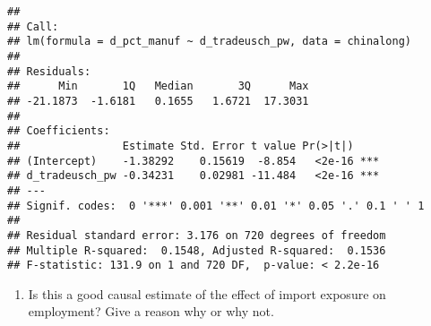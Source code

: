 \documentclass[
]{article}
\providecommand{\tightlist}{%
  \setlength{\itemsep}{0pt}\setlength{\parskip}{0pt}}
\begin{document}
\begin{verbatim}
## 
## Call:
## lm(formula = d_pct_manuf ~ d_tradeusch_pw, data = chinalong)
## 
## Residuals:
##      Min       1Q   Median       3Q      Max 
## -21.1873  -1.6181   0.1655   1.6721  17.3031 
## 
## Coefficients:
##                Estimate Std. Error t value Pr(>|t|)    
## (Intercept)    -1.38292    0.15619  -8.854   <2e-16 ***
## d_tradeusch_pw -0.34231    0.02981 -11.484   <2e-16 ***
## ---
## Signif. codes:  0 '***' 0.001 '**' 0.01 '*' 0.05 '.' 0.1 ' ' 1
## 
## Residual standard error: 3.176 on 720 degrees of freedom
## Multiple R-squared:  0.1548, Adjusted R-squared:  0.1536 
## F-statistic: 131.9 on 1 and 720 DF,  p-value: < 2.2e-16
\end{verbatim}

\begin{enumerate}
\def\labelenumi{\alph{enumi})}
\setcounter{enumi}{2}
\tightlist
\item
  Is this a good causal estimate of the effect of import exposure on
  employment? Give a reason why or why not.
\end{enumerate}
\end{document}

